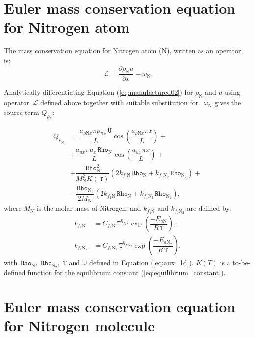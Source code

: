\documentclass[10pt]{article}
\newcommand{\diff}[2] {\dfrac{\partial #1 }{\partial #2}}
\newcommand{\Lo}{\,\mathcal{L}}
\newcommand{\Rho}{\,\mathtt{Rho}}
\newcommand{\T}{\,\mathtt{T}}
\newcommand{\U}{\,\mathtt{U}}
\begin{document}
\section{Euler mass conservation equation for Nitrogen atom}

The mass conservation equation for Nitrogen atom (N), written as an operator, is:
\begin{equation*}
 \label{eq:euler1d_11}
\Lo =  \diff{\rho_\text{N} u}{x} - \dot{\omega}_{\text{N}}.
\end{equation*}

Analytically differentiating Equation (\ref{eq:manufactured02}) for $\rho_{\text{N}}$  and $u$ using operator $\Lo$ defined above together with suitable substitution for ~$\dot{\omega}_\text{N}$ gives the source term $Q_{\rho_{\text{N}}}$:


\begin{equation}
\begin{split}
Q_{\rho_\text{N}}&= \dfrac{a_{ \rho \text{N} x} \pi \rho_{\text{N}x} \U }{L}\cos\left(\dfrac{a_{ \rho \text{N} x} \pi x}{L}\right)+\\
&+\dfrac{a_{ux} \pi u_x \Rho_\text{N} }{L}\cos\left(\dfrac{a_{ux} \pi x}{L}\right)+\\
&+ \dfrac{\Rho_\text{N}^2}{M_{\text{N}}^2 K(\T)}\left(2 k_{f_1 \text{N}} \Rho_\text{N}+k_{f_1 \text{N}_2} \Rho_{\text{N}_2}\right)  +\\
&-\dfrac{\Rho_{\text{N}_2}}{2M_{\text{N}}}\left(2 k_{f_1 \text{N}} \Rho_\text{N}+k_{f_1 \text{N}_2} \Rho_{\text{N}_2}\right) ,
\end{split}
\end{equation}
where $M_{\text{N}}$ is the molar mass of Nitrogen, and $k_{f_1 \text{N}}$ and $k_{f_1 \text{N}_2}$ are defined by:
\begin{equation}
 \begin{split}\label{eq:forward_rates}
k_{f_1 \text{N}} &= C_{f_1 \text{N}} \T^{\eta_{f_1 \text{N}}} \exp\left(\dfrac{-E_{a\text{N}}}{R \T}\right),\\
k_{f_1 \text{N}_2} &= C_{f_1 \text{N}_2} \T^{\eta_{f_1 \text{N}_2}} \exp\left(\dfrac{-E_{a\text{N}_2}}{R \T}\right).
 \end{split}
\end{equation}
with $\Rho_{\text{N}},\,\Rho_{\text{N}_2},\, \T$ and $\U$ defined in Equation (\ref{eq:aux_1d}).  $K(T)$ is a to-be-defined function for the equilibruim constant (\ref{eq:equilibrium_constant}).

\section{Euler mass conservation equation for Nitrogen molecule}
\end{document}
